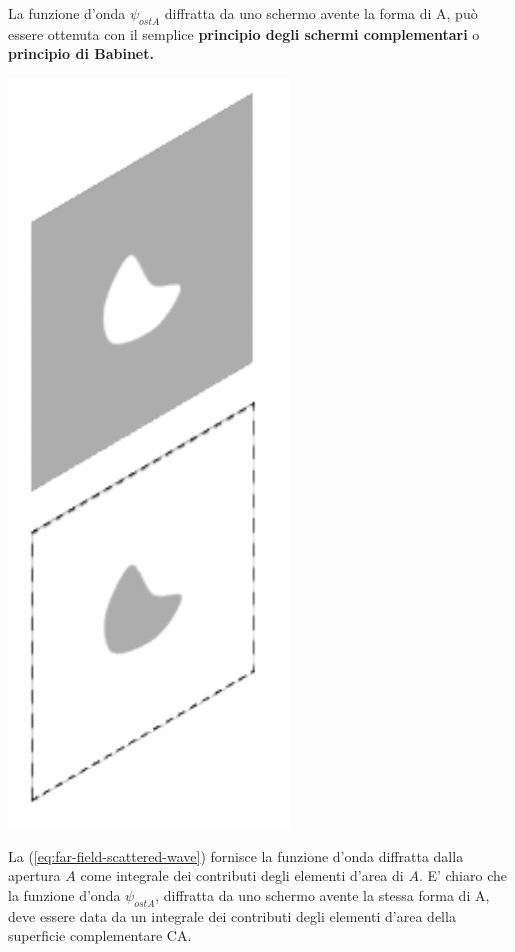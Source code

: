 La funzione d'onda \(\psi_{ost A}\) diffratta da uno schermo avente la
forma di A, può essere ottenuta con il semplice \textbf{principio degli
schermi complementari} o \textbf{principio di Babinet.}
\begin{marginfigure}
	\centering
	\includegraphics[width = .7 \textwidth, height = .7 \textheight]{figs/kirchhoff-diffraction-3}
	\label{fig:kirchhoff3}
\end{marginfigure}
La (\ref{eq:far-field-scattered-wave}) fornisce la funzione d'onda diffratta dalla apertura $A$ come integrale dei contributi degli elementi d'area
di $A$.
E' chiaro che la funzione d'onda $\psi_{ost A}$, diffratta da uno schermo avente la stessa forma di A, deve essere data
da un integrale dei contributi degli elementi d'area della superficie complementare CA.

